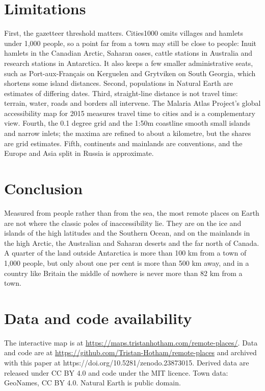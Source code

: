 \documentclass[11pt,a4paper]{article}
\begin{document}
\section{Limitations}
First, the gazetteer threshold matters. Cities1000 omits villages and hamlets under 1,000 people, so a point far from a town may still be close to people: Inuit hamlets in the Canadian Arctic, Saharan oases, cattle stations in Australia and research stations in Antarctica. It also keeps a few smaller administrative seats, such as Port-aux-Fran\c{c}ais on Kerguelen and Grytviken on South Georgia, which shortens some island distances. Second, populations in Natural Earth are estimates of differing dates. Third, straight-line distance is not travel time: terrain, water, roads and borders all intervene. The Malaria Atlas Project's global accessibility map for 2015 \citep{weiss2018} measures travel time to cities and is a complementary view. Fourth, the 0.1 degree grid and the 1:50m coastline smooth small islands and narrow inlets; the maxima are refined to about a kilometre, but the shares are grid estimates. Fifth, continents and mainlands are conventions, and the Europe and Asia split in Russia is approximate.

\section{Conclusion}
Measured from people rather than from the sea, the most remote places on Earth are not where the classic poles of inaccessibility lie. They are on the ice and islands of the high latitudes and the Southern Ocean, and on the mainlands in the high Arctic, the Australian and Saharan deserts and the far north of Canada. A quarter of the land outside Antarctica is more than 100 km from a town of 1,000 people, but only about one per cent is more than 500 km away, and in a country like Britain the middle of nowhere is never more than 82 km from a town.

\section*{Data and code availability}
The interactive map is at \url{https://maps.tristanhotham.com/remote-places/}. Data and code are at \url{https://github.com/Tristan-Hotham/remote-places} and archived with this paper at https://doi.org/10.5281/zenodo.23873015. Derived data are released under CC BY 4.0 and code under the MIT licence. Town data: GeoNames, CC BY 4.0. Natural Earth is public domain.
\end{document}
